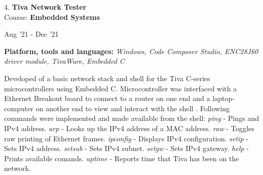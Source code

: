 \documentclass[10pt]{article}
\newenvironment{innerlist}[1][\enskip\textbullet]%
        {\begin{compactitem}[#1]}{\end{compactitem}}
\newenvironment{loneinnerlist}[1][\enskip\textbullet]%
        {\vspace{-\baselineskip}\begin{compactitem}[#1]}
        {\end{compactitem}\vspace{-.6\baselineskip}}
\begin{document}
\begin{loneinnerlist}
\item[4.]\textbf{Tiva Network Tester} \\ 
\vspace{4pt}
Course: \textbf{Embedded Systems} \\
\vspace*{-28pt} \begin{flushright} Aug '21 - Dec '21 \end{flushright}
\textbf{Platform, tools and languages:} \emph{Windows, Code Composer Studio, ENC28J60 driver module, TivaWare, Embedded C}
\vspace*{2pt}
\begin{innerlist} \item Developed of a basic network stack and shell for the Tiva C-series microcontrollers using Embedded C. Microcontroller was interfaced with a Ethernet Breakout board to connect to a router on one end and a laptop-computer on another end to view and interact with the shell . Following commands were implemented and made available from the shell:
   \subitem \emph{ping} - Pings and IPv4 address.
   \subitem \emph{arp} - Looks up the IPv4 address of a MAC address.
   \subitem \emph{raw} - Toggles raw printing of Ethernet frames.
   \subitem \emph{ipconfig} - Displays IPv4 configuration.
   \subitem \emph{setip} - Sets IPv4 address.
   \subitem \emph{setsub} - Sets IPv4 subnet.
   \subitem \emph{setgw} - Sets IPv4 gateway.
   \subitem \emph{help} - Prints available comands.
   \subitem \emph{uptime} - Reports time that Tiva has been on the network.
\end{innerlist}  \vspace*{4pt}


\end{loneinnerlist}
\end{document}
